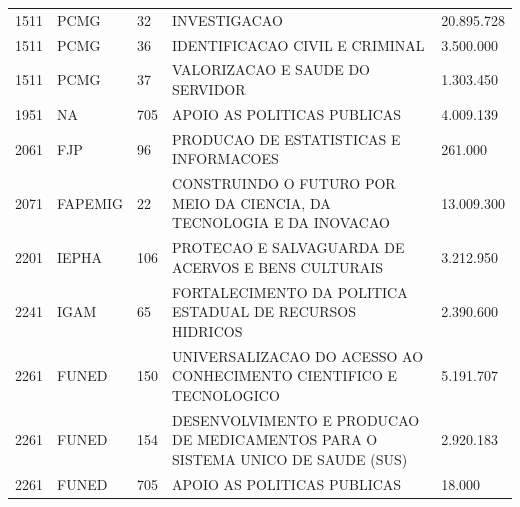 \documentclass{article}
\begin{document}
\begin{longtable}[c]{m{1cm}|m{1.5cm}|m{1cm}m{10cm}|m{2cm}}
\multicolumn{1}{C{1cm}|}{1511} & \multicolumn{1}{L{1.5cm}|}{PCMG} & \multicolumn{1}{C{1cm}|}{32} & \multicolumn{1}{L{10cm}|}{INVESTIGACAO} & \multicolumn{1}{R{2cm}}{20.895.728} \\
\multicolumn{1}{C{1cm}|}{1511} & \multicolumn{1}{L{1.5cm}|}{PCMG} & \multicolumn{1}{C{1cm}|}{36} & \multicolumn{1}{L{10cm}|}{IDENTIFICACAO CIVIL E CRIMINAL} & \multicolumn{1}{R{2cm}}{3.500.000} \\
\multicolumn{1}{C{1cm}|}{1511} & \multicolumn{1}{L{1.5cm}|}{PCMG} & \multicolumn{1}{C{1cm}|}{37} & \multicolumn{1}{L{10cm}|}{VALORIZACAO E SAUDE DO SERVIDOR} & \multicolumn{1}{R{2cm}}{1.303.450} \\
\multicolumn{1}{C{1cm}|}{1951} & \multicolumn{1}{L{1.5cm}|}{NA} & \multicolumn{1}{C{1cm}|}{705} & \multicolumn{1}{L{10cm}|}{APOIO AS POLITICAS PUBLICAS} & \multicolumn{1}{R{2cm}}{4.009.139} \\
\multicolumn{1}{C{1cm}|}{2061} & \multicolumn{1}{L{1.5cm}|}{FJP} & \multicolumn{1}{C{1cm}|}{96} & \multicolumn{1}{L{10cm}|}{PRODUCAO DE ESTATISTICAS E INFORMACOES} & \multicolumn{1}{R{2cm}}{261.000} \\
\multicolumn{1}{C{1cm}|}{2071} & \multicolumn{1}{L{1.5cm}|}{FAPEMIG} & \multicolumn{1}{C{1cm}|}{22} & \multicolumn{1}{L{10cm}|}{CONSTRUINDO O FUTURO POR MEIO DA CIENCIA, DA TECNOLOGIA E DA INOVACAO} & \multicolumn{1}{R{2cm}}{13.009.300} \\
\multicolumn{1}{C{1cm}|}{2201} & \multicolumn{1}{L{1.5cm}|}{IEPHA} & \multicolumn{1}{C{1cm}|}{106} & \multicolumn{1}{L{10cm}|}{PROTECAO E SALVAGUARDA DE ACERVOS E BENS CULTURAIS} & \multicolumn{1}{R{2cm}}{3.212.950} \\
\multicolumn{1}{C{1cm}|}{2241} & \multicolumn{1}{L{1.5cm}|}{IGAM} & \multicolumn{1}{C{1cm}|}{65} & \multicolumn{1}{L{10cm}|}{FORTALECIMENTO DA POLITICA ESTADUAL DE RECURSOS HIDRICOS} & \multicolumn{1}{R{2cm}}{2.390.600} \\
\multicolumn{1}{C{1cm}|}{2261} & \multicolumn{1}{L{1.5cm}|}{FUNED} & \multicolumn{1}{C{1cm}|}{150} & \multicolumn{1}{L{10cm}|}{UNIVERSALIZACAO DO ACESSO AO CONHECIMENTO CIENTIFICO E TECNOLOGICO} & \multicolumn{1}{R{2cm}}{5.191.707} \\
\multicolumn{1}{C{1cm}|}{2261} & \multicolumn{1}{L{1.5cm}|}{FUNED} & \multicolumn{1}{C{1cm}|}{154} & \multicolumn{1}{L{10cm}|}{DESENVOLVIMENTO E PRODUCAO DE MEDICAMENTOS PARA O SISTEMA UNICO DE SAUDE (SUS)} & \multicolumn{1}{R{2cm}}{2.920.183} \\
\multicolumn{1}{C{1cm}|}{2261} & \multicolumn{1}{L{1.5cm}|}{FUNED} & \multicolumn{1}{C{1cm}|}{705} & \multicolumn{1}{L{10cm}|}{APOIO AS POLITICAS PUBLICAS} & \multicolumn{1}{R{2cm}}{18.000} \\

\end{longtable}
\end{document}

